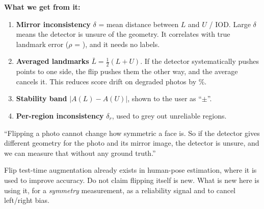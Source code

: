 \textbf{What we get from it:}
\begin{enumerate}
\item \textbf{Mirror inconsistency} $\delta$ = mean distance between $L$ and $U$ / IOD. Large
$\delta$ means the detector is unsure of the geometry. It correlates with true landmark
error ($\rho$ = \rhoMirrorNme{}), and it needs no labels.
\item \textbf{Averaged landmarks} $\bar L=\tfrac12(L+U)$. If the detector systematically
pushes points to one side, the flip pushes them the other way, and the average cancels it.
This reduces score drift on degraded photos by \driftReduction\%.
\item \textbf{Stability band} $|A(L)-A(U)|$, shown to the user as ``$\pm$''.
\item \textbf{Per-region inconsistency} $\delta_r$, used to grey out unreliable regions.
\end{enumerate}

\begin{say}
``Flipping a photo cannot change how symmetric a face is. So if the detector gives different
geometry for the photo and its mirror image, the detector is unsure, and we can measure
that without any ground truth.''
\end{say}

\begin{careful}
Flip test-time augmentation already exists in human-pose estimation, where it is used to
improve accuracy. Do not claim flipping itself is new. What is new here is using it, for a
\emph{symmetry} measurement, as a reliability signal and to cancel left/right bias.
\end{careful}

